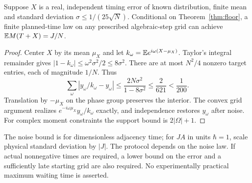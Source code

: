 \documentclass[11pt]{article}
\begin{document}
\begin{corollary}\label{cor:noise}
Suppose $X$ is a real, independent timing error of known distribution, finite mean and standard deviation $\sigma\le1/(25\sqrt N)$. Conditional on Theorem~\ref{thm:floor}, a finite planned-time law on any prescribed algebraic-step grid can achieve $\mathbb E M(T+X)=J/N$.
\end{corollary}
\begin{proof} Center $X$ by its mean $\mu_X$ and let $k_\omega=\mathbb E e^{i\omega(X-\mu_X)}$. Taylor's integral remainder gives $|1-k_\omega|\le \omega^2\sigma^2/2\le8\sigma^2$. There are at most $N^2/4$ nonzero target entries, each of magnitude $1/N$. Thus
\[\sum_\omega|y_\omega/k_\omega-y_\omega|\le\frac{2N\sigma^2}{1-8\sigma^2}\le\frac2{621}<\frac1{200}.\]
Translation by $-\mu_X$ on the phase group preserves the interior. The convex grid argument realizes $e^{-i\omega\mu_X}y_\omega/k_\omega$ exactly, and independence restores $y_\omega$ after noise. For complex moment constraints the support bound is $2|\Omega|+1$.\end{proof}
The noise bound is for dimensionless adjacency time; for $JA$ in units $\hbar=1$, scale physical standard deviation by $|J|$. The protocol depends on the noise law. If actual nonnegative times are required, a lower bound on the error and a sufficiently late starting grid are also required. No experimentally practical maximum waiting time is asserted.
\end{document}
